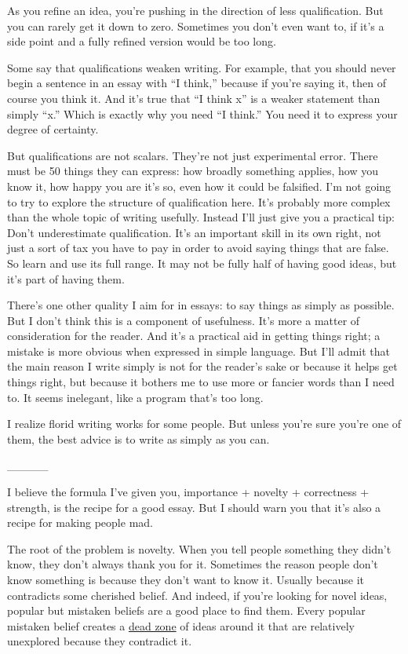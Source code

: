 As you refine an idea, you're pushing in the direction of less
qualification. But you can rarely get it down to zero. Sometimes you
don't even want to, if it's a side point and a fully refined version
would be too long.

Some say that qualifications weaken writing. For example, that you
should never begin a sentence in an essay with ``I think,'' because if
you're saying it, then of course you think it. And it's true that ``I
think x'' is a weaker statement than simply ``x.'' Which is exactly why
you need ``I think.'' You need it to express your degree of certainty.

But qualifications are not scalars. They're not just experimental error.
There must be 50 things they can express: how broadly something applies,
how you know it, how happy you are it's so, even how it could be
falsified. I'm not going to try to explore the structure of
qualification here. It's probably more complex than the whole topic of
writing usefully. Instead I'll just give you a practical tip: Don't
underestimate qualification. It's an important skill in its own right,
not just a sort of tax you have to pay in order to avoid saying things
that are false. So learn and use its full range. It may not be fully
half of having good ideas, but it's part of having them.

There's one other quality I aim for in essays: to say things as simply
as possible. But I don't think this is a component of usefulness. It's
more a matter of consideration for the reader. And it's a practical aid
in getting things right; a mistake is more obvious when expressed in
simple language. But I'll admit that the main reason I write simply is
not for the reader's sake or because it helps get things right, but
because it bothers me to use more or fancier words than I need to. It
seems inelegant, like a program that's too long.

I realize florid writing works for some people. But unless you're sure
you're one of them, the best advice is to write as simply as you can.

\_\_\_\_\_

I believe the formula I've given you, importance + novelty + correctness
+ strength, is the recipe for a good essay. But I should warn you that
it's also a recipe for making people mad.

The root of the problem is novelty. When you tell people something they
didn't know, they don't always thank you for it. Sometimes the reason
people don't know something is because they don't want to know it.
Usually because it contradicts some cherished belief. And indeed, if
you're looking for novel ideas, popular but mistaken beliefs are a good
place to find them. Every popular mistaken belief creates a
\href{nov.html}{dead zone} of ideas around it that are relatively
unexplored because they contradict it.

